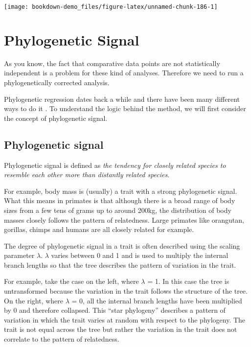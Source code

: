 \documentclass[
]{book}
\begin{document}
\begin{center}\texttt{[image: bookdown-demo\_files/figure-latex/unnamed-chunk-186-1]} \end{center}

\hypertarget{phylogenetic-signal}{%
\section{Phylogenetic Signal}\label{phylogenetic-signal}}

As you know, the fact that comparative data points are not statistically independent is a problem for these kind of analyses. Therefore we need to run a phylogenetically corrected analysis.

Phylogenetic regression dates back a while and there have been many different ways to do it \citep{Grafen89, Nunn11}. To understand the logic behind the method, we will first consider the concept of phylogenetic signal.

\hypertarget{phylogenetic-signal-1}{%
\subsection{Phylogenetic signal}\label{phylogenetic-signal-1}}

Phylogenetic signal is defined as \emph{the tendency for closely related species to resemble each other more than distantly related species}.

For example, body mass is (usually) a trait with a strong phylogenetic signal. What this means in primates is that although there is a broad range of body sizes from a few tens of grams up to around 200kg, the distribution of body masses closely follows the pattern of relatedness. Large primates like orangutan, gorillas, chimps and humans are all closely related for example.

The degree of phylogenetic signal in a trait is often described using the scaling parameter \(\lambda\). \(\lambda\) varies between 0 and 1 and is used to multiply the internal branch lengths so that the tree describes the pattern of variation in the trait.

For example, take the case on the left, where \(\lambda\) = 1. In this case the tree is untransformed because the variation in the trait follows the structure of the tree. On the right, where \(\lambda\) = 0, all the internal branch lengths have been multiplied by 0 and therefore collapsed. This ``star phylogeny'' describes a pattern of variation in which the trait varies at random with respect to the phylogeny. The trait is not equal across the tree but rather the variation in the trait does not correlate to the pattern of relatedness.
\end{document}
